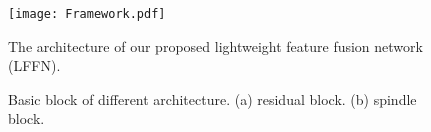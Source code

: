 \documentclass[journal]{IEEEtran}
\begin{document}
\begin{figure}[ht]
\centering
\texttt{[image: Framework.pdf]}
\caption{The architecture of our proposed lightweight feature fusion network (LFFN). }
\label{fig:framework}
\end{figure}
\begin{figure}[ht]
\centering
{}\centering
\caption{Basic block of different architecture. (a) residual block. (b) spindle block. }
\label{basic_block}
\end{figure}
\end{document}
